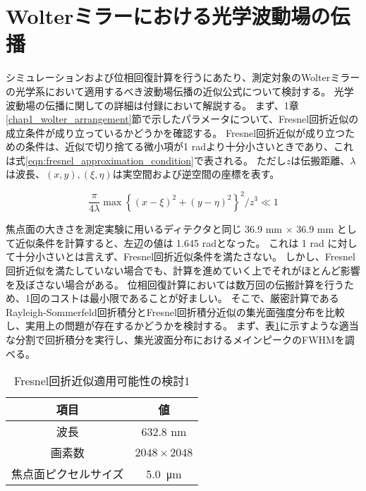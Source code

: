 \section{Wolterミラーにおける光学波動場の伝播}
\label{chap2_wolter_diffraction_apporoximation}

シミュレーションおよび位相回復計算を行うにあたり、測定対象のWolterミラーの光学系において適用するべき波動場伝播の近似公式について検討する。
光学波動場の伝播に関しての詳細は付録において解説する。
まず、1章\ref{chap1_wolter_arrangement}節で示したパラメータについて、Fresnel回折近似の成立条件が成り立っているかどうかを確認する。
Fresnel回折近似が成り立つための条件は、近似で切り捨てる微小項が1 radより十分小さいときであり、これは式\ref{eqn:fresnel_approximation_condition}で表される。
ただし$z$は伝搬距離、$\lambda$は波長、$(x, y), (\xi, \eta)$は実空間および逆空間の座標を表す。

\begin{equation}
\label{eqn:fresnel_approximation_condition}
    \frac{\pi}{4\lambda} \max \left\{ (x-\xi)^2 + (y-\eta)^2 \right\}^2 / z^3 \ll 1
\end{equation}

焦点面の大きさを測定実験に用いるディテクタと同じ 36.9 mm $\times$ 36.9 mm として近似条件を計算すると、左辺の値は 1.645 radとなった。
これは 1 rad に対して十分小さいとは言えず、Fresnel回折近似条件を満たさない。
しかし、Fresnel回折近似を満たしていない場合でも、計算を進めていく上でそれがほとんど影響を及ぼさない場合がある。
位相回復計算においては数万回の伝搬計算を行うため、1回のコストは最小限であることが好ましい。
そこで、厳密計算であるRayleigh-Sommerfeld回折積分とFresnel回折積分近似の集光面強度分布を比較し、実用上の問題が存在するかどうかを検討する。
まず、表\ref{tb:check_approximation_validity_1}に示すような適当な分割で回折積分を実行し、集光波面分布におけるメインピークのFWHMを調べる。

\begin{table}[!ht]
\begin{center}
  \caption{Fresnel回折近似適用可能性の検討1}
  \begin{tabular}{|c|c|} \hline
    項目 & 値 \\ \hline
    波長 & 632.8 nm \\
    画素数 & $2048 \times 2048$ \\
    焦点面ピクセルサイズ & \SI{5.0}{\micro \metre} \\ \hline
  \end{tabular}
  \label{tb:check_approximation_validity_1}
\end{center}
\end{table}

